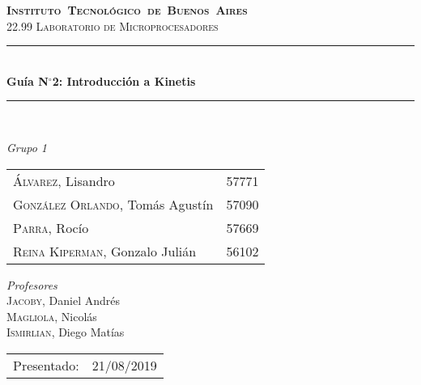 \begin{titlepage}

\def\titulo{Gu\'ia N$^\circ$2: Introducción a Kinetis}
\def\fecha-entrega{21/08/2019}



\newcommand{\HRule}{\rule{\linewidth}{0.5mm}}
\center
\mbox{\textsc{\LARGE \bfseries {Instituto Tecnol\'ogico de Buenos Aires}}}\\[1.5cm]
\textsc{\Large 22.99 Laboratorio de Microprocesadores}\\[0.5cm]


\HRule \\[0.6cm]
{ \Huge \bfseries \titulo }\\[0.4cm] %
\HRule \\[1.5cm]


{\large

\emph{Grupo 1}\\
\vspace{3px}

\begin{tabular}{lr} 	
\textsc{\'Alvarez}, Lisandro  & 57771 \\
\textsc{Gonz\'alez Orlando}, Tom\'as Agust\'in  & 57090 \\
\textsc{Parra}, Roc\'io  & 57669 \\
\textsc{Reina Kiperman}, Gonzalo Juli\'an  & 56102 \\
\end{tabular}

\vspace{30px}

\emph{Profesores}\\
\vspace{3px}
\textsc{Jacoby}, Daniel Andr\'es\\ 	
\textsc{Magliola}, Nicol\'as\\ 	
\textsc{Ismirlian}, Diego Mat\'ias\\ 	

\vspace{120px}

\begin{tabular}{ll}

Presentado: & \fecha-entrega\\

\end{tabular}

}

\vfill

\end{titlepage}